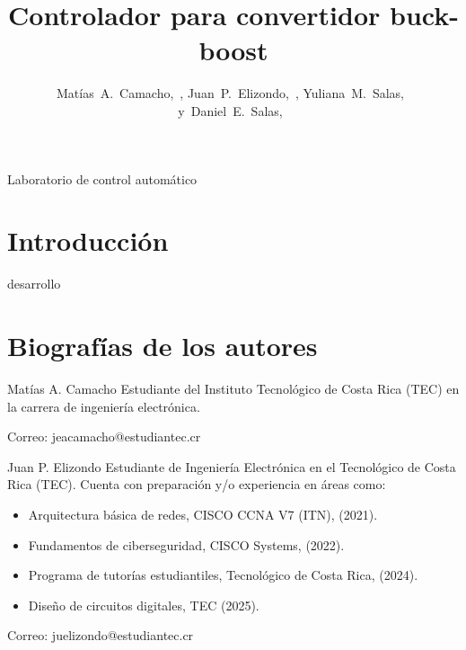 \documentclass[journal]{IEEEtran}
\begin{document}
\setlength{\parindent}{4.2mm}
\title{Controlador para convertidor buck-boost}

\author{Matías~A.~Camacho,~,
        Juan~P.~Elizondo,~,
        Yuliana~M.~Salas,~
        y~Daniel~E.~Salas,~
}

%
{Laboratorio de control automático}


\maketitle


\section{Introducción}

 desarrollo


\printbibliography

\section{Biografías de los autores}

 
\begin{IEEEbiographynophoto}{Matías A. Camacho}
        Estudiante del Instituto Tecnológico de Costa Rica (TEC) en la carrera de ingeniería electrónica.
        
        Correo: jeacamacho@estudiantec.cr
\end{IEEEbiographynophoto}

\begin{IEEEbiographynophoto}{Juan P. Elizondo}
        Estudiante de Ingeniería Electrónica en el Tecnológico de Costa Rica (TEC).
        Cuenta con preparación y/o experiencia en áreas como:
        \begin{itemize}
            \item Arquitectura básica de redes, CISCO CCNA V7 (ITN), (2021).
            \item Fundamentos de ciberseguridad, CISCO Systems, (2022).
            \item Programa de tutorías estudiantiles, Tecnológico de Costa Rica, (2024).
            \item Diseño de circuitos digitales, TEC (2025).
        \end{itemize}
        
        Correo: juelizondo@estudiantec.cr
\end{IEEEbiographynophoto}
\end{document}
